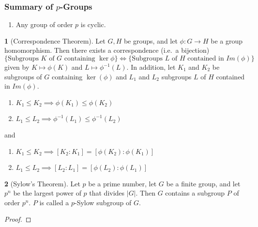 \documentclass[12pt]{article}
\theoremstyle{definition}
\newtheorem{theorem}{\color{ForestGreen}{\textbf{Theorem}}}
\theoremstyle{definition}
\begin{document}
\subsubsection*{Summary of $p$-Groups}
\begin{enumerate}
	\item Any group of order $p$ is cyclic.
\end{enumerate}

\begin{theorem}[Correspondence Theorem]
	Let $G, H$ be groups, and let $\phi : G \to H$ be a group homomorphism. Then there exists a correspondence (i.e.\ a bijection)
	\begin{equation*}
		\{\text{Subgroups $K$ of $G$ containing $\ker \phi$}\} \iff \{\text{Subgroups $L$ of $H$ contained in $Im(\phi)$}\}
	\end{equation*}
	given by $K \mapsto \phi(K)$ and $L \mapsto \phi^{-1}(L)$. In addition, let $K_1$ and $K_2$ be subgroups of $G$ containing $\ker(\phi)$ and $L_1$ and $L_2$ subgroups $L$ of $H$ contained in $Im(\phi)$. 
	\begin{enumerate}
		\item $K_1 \leq K_2 \implies \phi(K_1) \leq \phi(K_2)$
		\item $L_1 \leq L_2 \implies \phi^{-1}(L_1) \leq \phi^{-1}(L_2)$
	\end{enumerate}
	and
	\begin{enumerate}
		\item $K_1 \leq K_2 \implies [K_2 : K_1] = [\phi(K_2) : \phi(K_1)]$
		\item $L_1 \leq L_2 \implies [L_2 : L_1] = [\phi(L_2) : \phi(L_1)]$
	\end{enumerate}
\end{theorem}

\begin{theorem}[Sylow's Theorem]
	Let $p$ be a prime number, let $G$ be a finite group, and let $p^n$ be the largest power of $p$ that divides $
	|G|$. Then $G$ contains a subgroup $P$ of order $p^n$. $P$ is called a $p$-Sylow subgroup of $G$. 
\end{theorem}
\begin{proof}

\end{proof}
\end{document}
